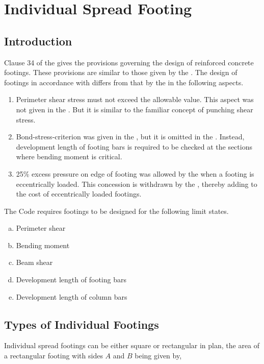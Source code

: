\chapter{Individual Spread Footing}
\section{Introduction} Clause 34 of the   gives the provisions
governing the design of reinforced concrete footings.  These provisions are
similar to those given by the \citeauthor{aci1981aci}. The design of footings in
accordance with  differs from that by
the  in the following aspects.

\begin{enumerate}[I]
\item Perimeter shear stress must not exceed the allowable value. This
aspect was not given in the . But it is similar to the familiar
concept of punching shear stress.

\item Bond-stress-criterion was given in the , but it is omitted in
the . Instead, development length of footing bars is required to be
checked at the sections where bending moment is critical.

\item 25\% excess pressure on edge of footing was allowed by the 
when a footing is eccentrically loaded. This concession is withdrawn by
the , thereby adding to the cost of eccentrically loaded footings.
\end{enumerate}
The Code requires footings to be designed for the following limit states.

\begin{enumerate}[(a)]
\item Perimeter shear
\item Bending moment
\item Beam shear
\item Development length of footing bars
\item Development length of column bars
\end{enumerate}

\section{Types of Individual Footings} Individual spread footings can be either square or rectangular in plan, the area of a rectangular footing with sides $A$ and $B$ being given by,

